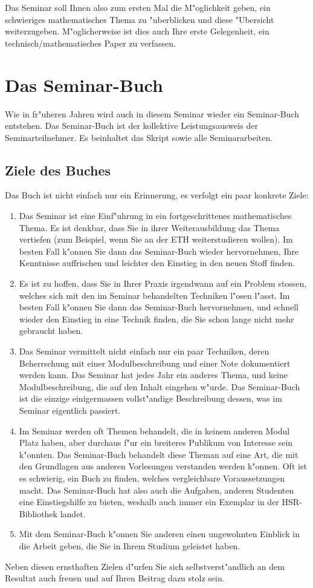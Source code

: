 \documentclass[a4paper]{article}
\begin{document}
Das Seminar soll Ihnen also zum ersten Mal die M"oglichkeit geben,
ein schwieriges mathematisches Thema zu "uberblicken und diese
"Ubersicht weiterzugeben.
M"oglicherweise ist dies auch Ihre erste Gelegenheit, ein
technisch/mathematisches Paper zu verfassen.

\section{Das Seminar-Buch}
Wie in fr"uheren Jahren wird auch in diesem Seminar wieder ein
Seminar-Buch entstehen.
Das Seminar-Buch ist der kollektive Leistungsausweis der Seminarteilnehmer.
Es beinhaltet das Skript sowie alle Seminararbeiten.

\subsection{Ziele des Buches}
Das Buch ist nicht einfach nur ein Erinnerung, es verfolgt ein paar
konkrete Ziele:
\begin{enumerate}
\item
Das Seminar ist eine Einf"uhrung in ein fortgeschrittenes mathematisches
Thema.
Es ist denkbar, dass Sie in ihrer Weiterausbildung das Thema vertiefen
(zum Beispiel, wenn Sie an der ETH weiterstudieren wollen).
Im besten Fall k"onnen Sie dann das Seminar-Buch wieder hervornehmen,
Ihre Kenntnisse auffrischen und leichter den Einstieg
in den neuen Stoff finden.
\item
Es ist zu hoffen, dass Sie in Ihrer Praxis irgendwann auf ein Problem
stossen, welches sich mit den im Seminar behandelten Techniken
l"osen l"asst. 
Im besten Fall k"onnen Sie dann das Seminar-Buch hervornehmen, und
schnell wieder den Einstieg in eine Technik finden, die Sie schon lange
nicht mehr gebraucht haben.
\item
Das Seminar vermittelt nicht einfach nur ein paar Techniken, deren
Beherrschung mit einer Modulbeschreibung und einer Note dokumentiert
werden kann.
Das Seminar hat jedes Jahr ein anderes Thema, und keine Modulbeschreibung,
die auf den Inhalt eingehen w"urde.
Das Seminar-Buch ist die einzige einigermassen vollst"andige Beschreibung
dessen, was im Seminar eigentlich passiert.
\item
Im Seminar werden oft Themen behandelt, die in keinem anderen Modul
Platz haben, aber durchaus f"ur ein breiteres Publikum von Interesse
sein k"onnten.
Das Seminar-Buch behandelt diese Theman auf eine Art, die mit den Grundlagen
aus anderen Vorlesungen verstanden werden k"onnen.
Oft ist es schwierig, ein Buch zu finden, welches vergleichbare
Voraussetzungen macht.
Das Seminar-Buch hat also auch die Aufgaben, anderen Studenten
eine Einstiegshilfe zu bieten, weshalb auch immer ein Exemplar
in der HSR-Bibliothek landet.
\item
Mit dem Seminar-Buch k"onnen Sie anderen einen ungewohnten Einblick 
in die Arbeit geben, die Sie in Ihrem Studium geleistet haben.
\end{enumerate}
Neben diesen ernsthaften Zielen d"urfen Sie sich selbstverst"andlich an
dem Resultat auch freuen und auf Ihren Beitrag dazu stolz sein.
\end{document}
